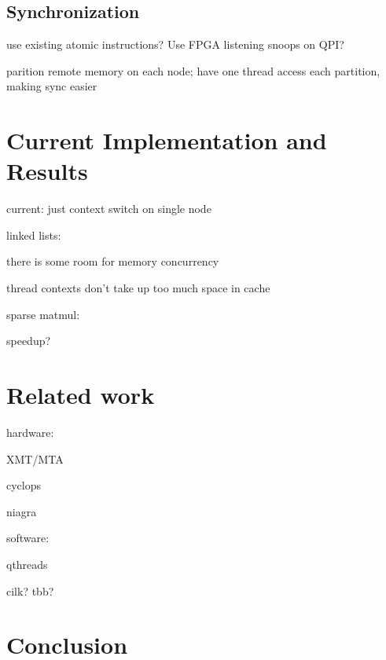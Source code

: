 \documentclass{acm_proc_article-sp}
\begin{document}
\subsection{Synchronization}

use existing atomic instructions? Use FPGA listening snoops on QPI?


parition remote memory on each node; have one thread access each
partition, making sync easier

\section{Current Implementation and Results}

current: just context switch on single node


linked lists:

there is some room for memory concurrency

thread contexts don't take up too much space in cache

sparse matmul:

speedup?






\section{Related work}


hardware:

XMT/MTA

cyclops

niagra

software:

qthreads

cilk? tbb?



\section{Conclusion}
\end{document}
